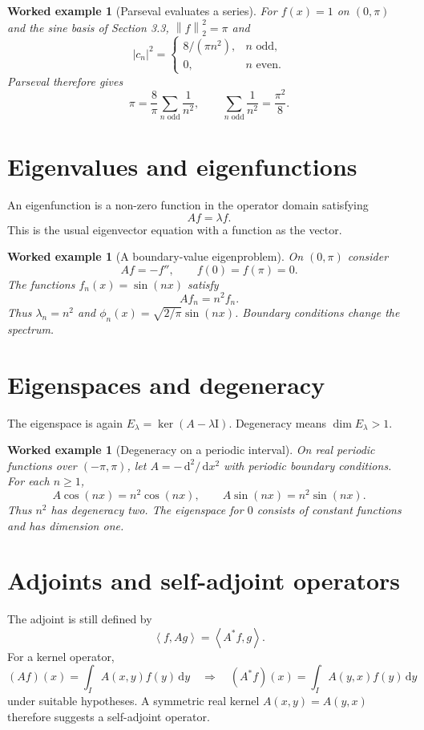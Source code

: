 \documentclass[11pt,a5paper,oneside,openany]{scrreprt}
\theoremstyle{notes}
\theoremstyle{definitions}
\newtheorem{example}[theorem]{Worked example}
\newcommand{\ip}[2]{\left\langle #1,#2\right\rangle}
\newcommand{\norm}[1]{\left\lVert #1\right\rVert}
\newcommand{\Ker}{\operatorname{ker}}
\newcommand{\Id}{\mathrm{I}}
\newcommand{\dd}{\,\mathrm{d}}
\begin{document}
\begin{example}[Parseval evaluates a series]
For $f(x)=1$ on $(0,\pi)$ and the sine basis of Section 3.3,
$\norm{f}_2^2=\pi$ and
\[
 |c_n|^2=
 \begin{cases}
  8/(\pi n^2),&n\text{ odd},\\
  0,&n\text{ even}.
 \end{cases}
\]
Parseval therefore gives
\[
 \pi=\frac8\pi\sum_{n\text{ odd}}\frac1{n^2},
 \qquad
 \sum_{n\text{ odd}}\frac1{n^2}=\frac{\pi^2}{8}.
\]
\end{example}

\section{Eigenvalues and eigenfunctions}

An eigenfunction is a non-zero function in the operator domain satisfying
\[
  \boxed{Af=\lambda f}.
\]
This is the usual eigenvector equation with a function as the vector.

\begin{example}[A boundary-value eigenproblem]
On $(0,\pi)$ consider
\[
 Af=-f'',
 \qquad f(0)=f(\pi)=0.
\]
The functions $f_n(x)=\sin(nx)$ satisfy
\[
 Af_n=n^2f_n.
\]
Thus $\lambda_n=n^2$ and
$\phi_n(x)=\sqrt{2/\pi}\sin(nx)$.  Boundary conditions change the spectrum.
\end{example}

\section{Eigenspaces and degeneracy}

The eigenspace is again $E_\lambda=\Ker(A-\lambda\Id)$.  Degeneracy means
$\dim E_\lambda>1$.

\begin{example}[Degeneracy on a periodic interval]
On real periodic functions over $(-\pi,\pi)$, let $A=-\dd^2/\dd x^2$ with
periodic boundary conditions.  For each $n\ge1$,
\[
 A\cos(nx)=n^2\cos(nx),
 \qquad
 A\sin(nx)=n^2\sin(nx).
\]
Thus $n^2$ has degeneracy two.  The eigenspace for $0$ consists of constant
functions and has dimension one.
\end{example}

\section{Adjoints and self-adjoint operators}

The adjoint is still defined by
\[
  \boxed{\ip{f}{Ag}=\ip{A^*f}{g}}.
\]
For a kernel operator,
\[
 (Af)(x)=\int_IA(x,y)f(y)\dd y
 \quad\Longrightarrow\quad
 (A^*f)(x)=\int_IA(y,x)f(y)\dd y
\]
under suitable hypotheses.  A symmetric real kernel $A(x,y)=A(y,x)$ therefore
suggests a self-adjoint operator.
\end{document}
